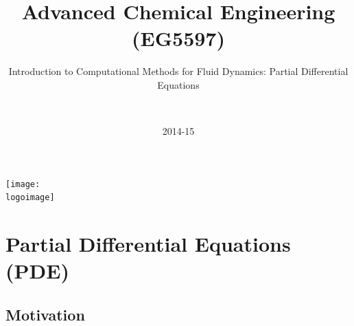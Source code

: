 \documentclass[10pt,compress]{beamer}
\institute{School of Engineering}
\title{Advanced Chemical Engineering (EG5597)}
\subtitle{Introduction to Computational Methods for Fluid Dynamics: Partial Differential Equations}
\date[2014-15]{2014-15}
\author[\shortname]{%
  \fullname\\\ttfamily{\emailaddress}
}
\newcommand{\logoimage}{./FigBanner/UoAHorizBanner}
\begin{document}
\begin{frame}
  \titlepage
  \vfill%
  \begin{center}
    \texttt{[image: \\logoimage]}
  \end{center}
\end{frame}







\section{Partial Differential Equations (PDE)} 

\subsection{Motivation}
\end{document}

